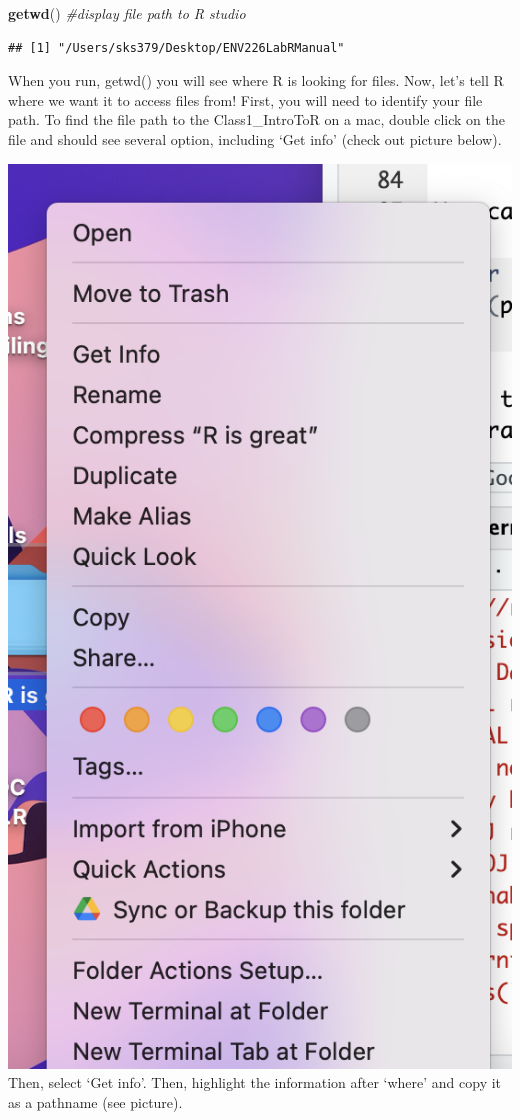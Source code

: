 \documentclass[
]{book}
\newenvironment{Shaded}{\begin{snugshade}}{\end{snugshade}}
\newcommand{\CommentTok}[1]{\textcolor[rgb]{0.56,0.35,0.01}{\textit{#1}}}
\newcommand{\FunctionTok}[1]{\textcolor[rgb]{0.13,0.29,0.53}{\textbf{#1}}}
\newcommand{\NormalTok}[1]{#1}
\begin{document}
\begin{Shaded}
\begin{Highlighting}[]
\FunctionTok{getwd}\NormalTok{() }\CommentTok{\#display file path to R studio }
\end{Highlighting}
\end{Shaded}

\begin{verbatim}
## [1] "/Users/sks379/Desktop/ENV226LabRManual"
\end{verbatim}

When you run, getwd() you will see where R is looking for files. Now, let's tell R where we want it to access files from! First, you will need to identify your file path. To find the file path to the Class1\_IntroToR on a mac, double click on the file and should see several option, including `Get info' (check out picture below).

\includegraphics{images/01-intro/workingdirectorymac.png}
Then, select `Get info'. Then, highlight the information after `where' and copy it as a pathname (see picture).
\end{document}
